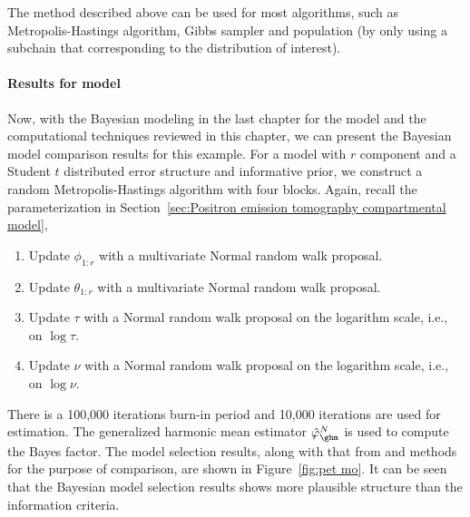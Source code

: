 The method described above can be used for most \mcmc algorithms, such as
Metropolis-Hastings algorithm, Gibbs sampler and population \mcmc (by only
using a subchain that corresponding to the distribution of interest).

\paragraph{Results for \pet model}

Now, with the Bayesian modeling in the last chapter for the \pet model and the
computational techniques reviewed in this chapter, we can present the Bayesian
model comparison results for this example. For a \pet model with $r$ component
and a Student $t$ distributed error structure and informative prior, we
construct a random Metropolis-Hastings algorithm with four blocks. Again,
recall the parameterization in Section~\ref{sec:Positron emission tomography
  compartmental model},
\begin{enumerate}
  \item Update $\phi_{1:r}$ with a multivariate Normal random walk proposal.
  \item Update $\theta_{1:r}$ with a multivariate Normal random walk proposal.
  \item Update $\tau$ with a Normal random walk proposal on the logarithm
    scale, i.e., on $\log\tau$.
  \item Update $\nu$ with a Normal random walk proposal on the logarithm
    scale, i.e., on $\log\nu$.
\end{enumerate}
There is a 100,000 iterations burn-in period and 10,000 iterations are used
for estimation. The generalized harmonic mean estimator $\hat\varphi_{\ghm}^N$
is used to compute the Bayes factor. The model selection results, along with
that from \aic and \bic methods for the purpose of comparison, are shown in
Figure~\ref{fig:pet mo}. It can be seen that the Bayesian model selection
results shows more plausible structure than the information criteria.

